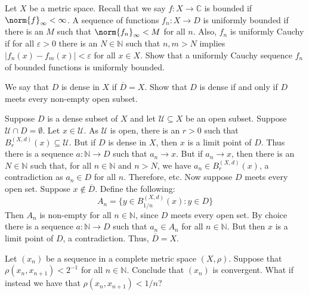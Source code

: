 \documentclass[crop=false,class=article,oneside]{standalone}
\begin{document}
    \begin{problem}
        Let $X$ be a metric space. Recall that we say
        $f:X\rightarrow\mathbb{C}$ is bounded if
        $\norm{f}_{\infty}<\infty$. A sequence of functions
        $f_{n}:X\rightarrow{D}$ is uniformly bounded if there is an
        $M$ such that $\norm{f_{n}}_{\infty}<M$ for all $n$.
        Also, $f_{n}$ is uniformly Cauchy if for all $\varepsilon>0$
        there is an $N\in\mathbb{N}$ such that $n,m>N$ implies
        $|f_{n}(x)-f_{m}(x)|<\varepsilon$ for all $x\in{X}$. Show that
        a uniformly Cauchy sequence $f_{n}$ of bounded functions is
        uniformly bounded.
    \end{problem}
    \begin{problem}
        We say that $D$ is dense in $X$ if $\overline{D}=X$.
        Show that $D$ is dense if and only if $D$ meets every
        non-empty open subset.
    \end{problem}
    \begin{solution}
        Suppose $D$ is a dense subset of $X$ and let
        $\mathcal{U}\subseteq{X}$ be an open subset. Suppose
        $\mathcal{U}\cap{D}=\emptyset$. Let $x\in\mathcal{U}$. As
        $\mathcal{U}$ is open, there is an $r>0$ such that
        $B_{r}^{(X,d)}(x)\subseteq\mathcal{U}$. But if $D$ is
        dense in $X$, then $x$ is a limit point of $D$. Thus there is
        a sequence $a:\mathbb{N}\rightarrow{D}$ such that
        $a_{n}\rightarrow{x}$. But if $a_{n}\rightarrow{x}$, then there
        is an $N\in\mathbb{N}$ such that, for all $n\in\mathbb{N}$ and
        $n>N$, we have $a_{n}\in{B}_{r}^{(X,d)}(x)$, a contradiction
        as $a_{n}\in{D}$ for all $n$. Therefore, etc. Now suppose
        $D$ meets every open set. Suppose $x\notin\overline{D}$.
        Define the following:
        \begin{equation}
            A_{n}=\Big\{y\in{B}_{1/n}^{(X,d)}(x):y\in{D}\Big\}
        \end{equation}
        Then $A_{n}$ is non-empty for all $n\in\mathbb{N}$, since
        $D$ meets every open set. By choice there is a sequence
        $a:\mathbb{N}\rightarrow{D}$ such that $a_{n}\in{A}_{n}$ for all
        $n\in\mathbb{N}$. But then $x$ is a limit point of $D$, a
        contradiction. Thus, $\overline{D}=X$.
    \end{solution}
    \begin{problem}
        Let $(x_{n})$ be a sequence in a complete metric space
        $(X,\rho)$. Suppose that $\rho(x_{n},x_{n+1})<2^{\minus{1}}$ for
        all $n\in\mathbb{N}$. Conclude that $(x_{n})$ is convergent.
        What if instead we have that $\rho(x_{n},x_{n+1})<1/n$?
    \end{problem}
\end{document}
